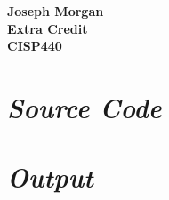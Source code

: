 \documentclass[12pt,titlepage]{article}
\begin{document}
\begin{titlepage}
	\centering
	\vfill
	{\bfseries\Large
		Joseph Morgan\\
		\large
		Extra Credit\\
		\vskip2cm
		CISP440\\
	}
	\vfill
	\vfill
	\vfill
\end{titlepage}
\section{\textit{Source Code}}

\section{\textit{Output}}

\end{document}
